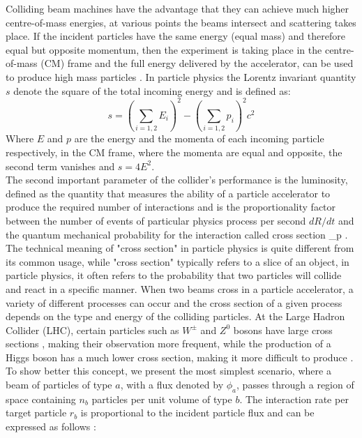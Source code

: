 Colliding beam machines have the advantage that they can achieve much higher centre-of-mass energies, at various points the beams intersect and scattering takes place. If the incident particles have the same energy (equal mass) and therefore equal but opposite momentum, then the experiment is taking place in the centre-of-mass (CM) frame and the full energy delivered by the accelerator, can be used to produce high mass particles  \cite{undergraduate_accelerators_chapter}.
In particle physics the Lorentz invariant quantity $s$ denote the square of the total incoming energy and is defined as: 
\begin{equation}
s = \left ( \sum_{i = 1,2}^{}E_{i} \right )^{2}-\left ( \sum_{i = 1,2}^{}p_{i} \right )^{2}c^{2}
\end{equation}
Where $E$ and \textbf{$p$}  are the energy and the momenta of each incoming particle respectively, in the CM frame, where the momenta are equal and opposite, the second term vanishes and  $s = 4E^2$.\\

The second important parameter of the collider's performance is the luminosity, defined as the  quantity that measures the ability of a particle accelerator to produce the required number of interactions and is the proportionality factor  between the number of events of particular physics process per second $dR/dt$ and the quantum mechanical probability for the interaction called cross section \sigma_{p} \cite{ref_lib_vol3}.\\

The technical meaning of "cross section" in particle physics is quite different from its common usage, while "cross section" typically refers to a slice of an object, in particle physics, it often refers to the probability that two particles will collide and react in a specific manner. When two beams cross in a particle accelerator, a variety of different processes can occur and  the cross section of a given process depends on the type and energy of the colliding particles.
At the Large Hadron Collider (LHC), certain particles such as  $W^{\pm}$ and $Z^{0}$ bosons have large cross sections , making their observation more frequent, while the production of a Higgs boson has a much lower cross section, making it more difficult to produce \cite{thomson_2013}.\\

To show better this concept, we present the most simplest scenario, where a beam of particles of type $a$, with a flux denoted by $\phi_{a}$, passes through a region of space containing $n_{b}$ particles per unit volume of type $b$. The interaction rate per target particle $r_{b}$ is proportional to the incident particle flux and can be expressed as follows \cite{thomson_2013}:


